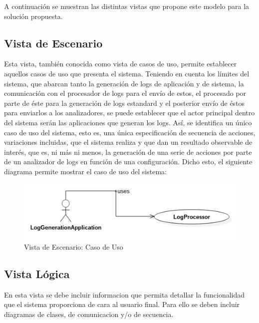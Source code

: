 \documentclass[11pt]{article}
\begin{document}
A continuación se muestran las distintas vistas que propone este modelo para la solución propuesta.

\subsection{Vista de Escenario}

Esta vista, también conocida como vista de casos de uso, permite establecer aquellos casos de uso que presenta el sistema.
Teniendo en cuenta los límites del sistema, que abarcan tanto la generación de logs de aplicación y de sistema, la comunicación con el procesador de logs para el envío de estos, el procesado por parte de éste para la generación de logs estandard y el posterior envío de éstos para enviarlos a los analizadores, se puede establecer que el actor principal dentro del sistema serán las aplicaciones que generan los logs.
Así, se identifica un único caso de uso del sistema, esto es, una única especificación de secuencia de acciones, variaciones incluidas, que el sistema realiza y que dan un resultado observable de interés, que es, ni más ni menos, la generación de una serie de acciones por parte de un analizador de logs en función de una configuración.
Dicho esto, el siguiente diagrama permite mostrar el caso de uso del sistema:

\begin{center}
 \begin{figure}[H]
 \begin{center}
   \includegraphics[width=15cm]{img/use_case00.png}
   \caption{Vista de Escenario: Caso de Uso}
   \label{fig:4plus1views}
 \end{center}
 \end{figure}
\end{center}

\subsection{Vista Lógica}

En esta vista se debe incluir informacion que permita detallar la funcionalidad que el sistema proporciona de cara al usuario final. Para ello se deben incluir diagramas de clases, de comunicacion y/o de secuencia.
\end{document}
